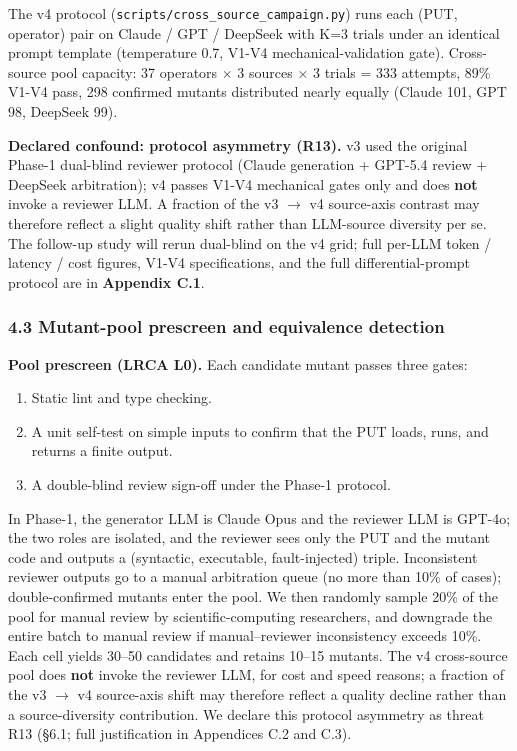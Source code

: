 \documentclass[review,12pt,authoryear]{elsarticle}
\providecommand{\tightlist}{\setlength{\itemsep}{0pt}\setlength{\parskip}{0pt}}
\begin{document}
The v4 protocol (\texttt{scripts/cross\_source\_campaign.py}) runs each
(PUT, operator) pair on Claude / GPT / DeepSeek with K=3 trials under an
identical prompt template (temperature 0.7, V1-V4 mechanical-validation
gate). Cross-source pool capacity: 37 operators $\times$ 3 sources $\times$ 3 trials =
333 attempts, 89\% V1-V4 pass, 298 confirmed mutants distributed nearly
equally (Claude 101, GPT 98, DeepSeek 99).

\textbf{Declared confound: protocol asymmetry (R13).} v3 used the
original Phase-1 dual-blind reviewer protocol (Claude generation +
GPT-5.4 review + DeepSeek arbitration); v4 passes V1-V4 mechanical gates
only and does \textbf{not} invoke a reviewer LLM. A fraction of the v3 $\to$
v4 source-axis contrast may therefore reflect a slight quality shift
rather than LLM-source diversity per se. The follow-up study will rerun
dual-blind on the v4 grid; full per-LLM token / latency / cost figures,
V1-V4 specifications, and the full differential-prompt protocol are in
\textbf{Appendix C.1}.

\subsubsection{4.3 Mutant-pool prescreen and equivalence detection}\label{mutant-pool-prescreen-and-equivalence-detection}

\textbf{Pool prescreen (LRCA L0).} Each candidate mutant passes three
gates:
\begin{enumerate}
\tightlist
\item Static lint and type checking.
\item A unit self-test on simple inputs to confirm that the PUT loads,
  runs, and returns a finite output.
\item A double-blind review sign-off under the Phase-1 protocol.
\end{enumerate} In Phase-1, the generator LLM is Claude Opus and the reviewer
LLM is GPT-4o; the two roles are isolated, and the reviewer sees only
the PUT and the mutant code and outputs a (syntactic, executable,
fault-injected) triple. Inconsistent reviewer outputs go to a manual
arbitration queue (no more than 10\% of cases); double-confirmed mutants
enter the pool. We then randomly sample 20\% of the pool for manual
review by scientific-computing researchers, and downgrade the entire
batch to manual review if manual--reviewer inconsistency exceeds 10\%.
Each cell yields 30--50 candidates and retains 10--15 mutants. The v4
cross-source pool does \textbf{not} invoke the reviewer LLM, for cost
and speed reasons; a fraction of the v3 $\to$ v4 source-axis shift may
therefore reflect a quality decline rather than a source-diversity
contribution. We declare this protocol asymmetry as threat R13 (§6.1;
full justification in Appendices C.2 and C.3).
\end{document}

